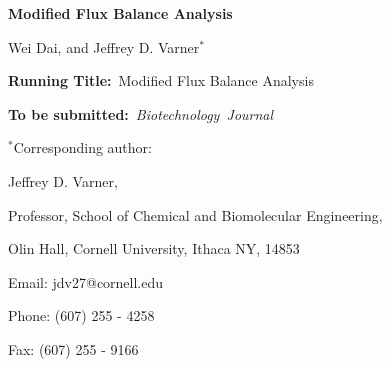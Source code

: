 \documentclass[12pt]{article}
\begin{document}
\begin{titlepage}
{\par\centering\textbf{\Large {Modified Flux Balance Analysis}}}
\vspace{0.05in}
{\par \centering \large{ Wei Dai, and Jeffrey D. Varner$^{*}$}}
\vspace{0.10in}
{\par {}}
{\par {}}
\vspace{0.1in}
{\par \centering \textbf{Running Title:}~Modified Flux Balance Analysis}
\vspace{0.1in}
{\par \centering \textbf{To be submitted:}~\emph{Biotechnology~Journal}}
\vspace{0.5in}
{\par \centering $^{*}$Corresponding author:}
{\par \centering Jeffrey D. Varner,}
{\par \centering Professor, School of Chemical and Biomolecular Engineering,}
{\par {} Olin Hall, Cornell University, Ithaca NY, 14853}
{\par \centering Email: jdv27@cornell.edu}
{\par \centering Phone: (607) 255 - 4258}
{\par \centering Fax: (607) 255 - 9166}
\end{titlepage}
\date{}
\thispagestyle{empty}
\pagebreak
\end{document}
